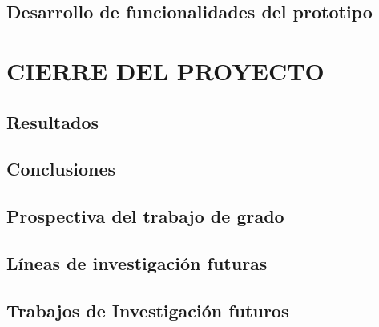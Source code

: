 \chapter{Desarrollo de funcionalidades del prototipo}

\part{ CIERRE DEL PROYECTO}
\chapter{Resultados}
\chapter{Conclusiones}
\chapter{Prospectiva del trabajo de grado}
\chapter{Líneas de investigación futuras}
\chapter{Trabajos de Investigación futuros}


%
%
